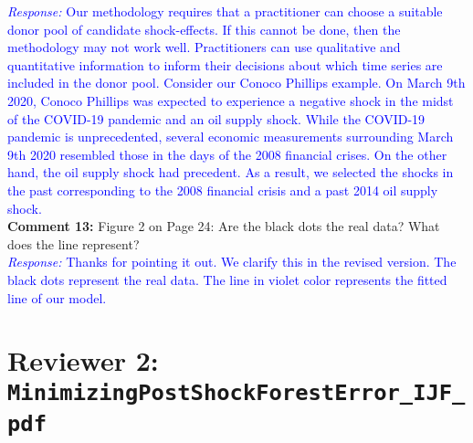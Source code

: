 \documentclass[12pt]{article}
\newcommand{\response}[1]{\noindent \textcolor{blue}{\emph{Response:} #1}}
\begin{document}
{%


\response{Our methodology requires that a practitioner can choose a suitable donor pool of candidate shock-effects. If this cannot be done, then the methodology may not work well. Practitioners can use qualitative and quantitative information to inform their decisions about which time series are included in the donor pool. Consider our Conoco Phillips example. On March 9th 2020, Conoco Phillips was expected to experience a negative shock in the midst of the  COVID-19 pandemic and an oil supply shock. While the COVID-19 pandemic is unprecedented, several economic measurements surrounding March 9th 2020 resembled those in the days of the 2008 financial crises. On the other hand, the oil supply shock had precedent. As a result, we selected the shocks in the past corresponding to the 2008 financial crisis and a past 2014 oil supply shock.} \\


{\bf Comment 13:} Figure 2 on Page 24: Are the black dots the real data? What does the line represent?\\

\response{Thanks for pointing it out. We  clarify this in the revised version. The black dots represent the real data. The line in violet color represents the fitted line of our model.}

\newpage

\section*{Reviewer 2:  \texttt{MinimizingPostShockForestError\_IJF\_pdf}}

}
\end{document}

